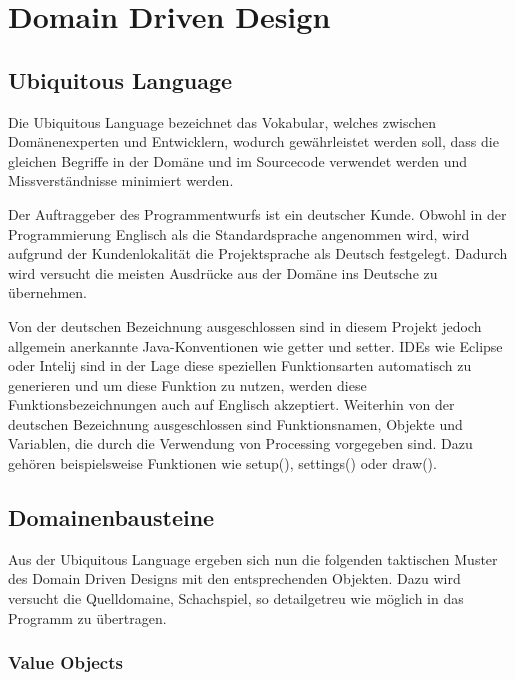 \chapter{Domain Driven Design}
\label{txt:ddd}

\section{Ubiquitous Language}

Die Ubiquitous Language bezeichnet das Vokabular, welches zwischen Domänenexperten
und Entwicklern, wodurch gewährleistet werden soll, dass die gleichen Begriffe in der
Domäne und im Sourcecode verwendet werden und Missverständnisse minimiert werden.

Der Auftraggeber des Programmentwurfs ist ein deutscher Kunde. 
Obwohl in der Programmierung Englisch als die Standardsprache angenommen wird, wird aufgrund der Kundenlokalität die Projektsprache als \glqq Deutsch\grqq{} festgelegt. 
Dadurch wird versucht die meisten Ausdrücke aus der Domäne ins Deutsche zu übernehmen. 

Von der deutschen Bezeichnung ausgeschlossen sind in diesem Projekt jedoch allgemein anerkannte Java-Konventionen wie \glqq getter\grqq{} und \glqq{} setter\grqq{}. 
IDEs wie Eclipse oder Intelij sind in der Lage diese speziellen Funktionsarten automatisch zu generieren und um diese Funktion zu nutzen, werden diese Funktionsbezeichnungen auch auf Englisch akzeptiert. 
Weiterhin von der deutschen Bezeichnung ausgeschlossen sind Funktionsnamen, Objekte und Variablen, die durch die Verwendung von Processing vorgegeben sind. 
Dazu gehören beispielsweise Funktionen  wie \glqq setup(), settings()\grqq{} oder \glqq draw()\grqq{}.

\section{Domainenbausteine}

Aus der Ubiquitous Language ergeben sich nun die folgenden taktischen Muster des Domain
Driven Designs mit den entsprechenden Objekten.
Dazu wird versucht die Quelldomaine, Schachspiel, so detailgetreu wie möglich in das Programm zu übertragen. 

\newpage

\subsection{Value Objects}

